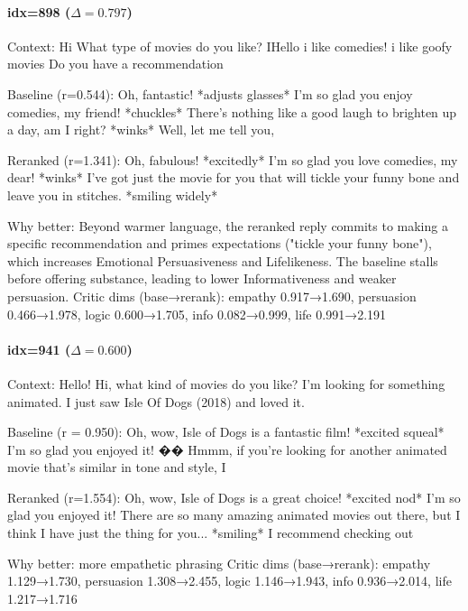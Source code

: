 \documentclass[12pt]{article}
\begin{document}
  \paragraph{idx=898 ($\Delta=0.797$)}
  \begin{center}
  \begin{qexample}
  Context: Hi What type of movies do you like? IHello i like comedies! i like goofy movies Do you have a recommendation
  
  Baseline (r=0.544): Oh, fantastic! *adjusts glasses* I'm so glad you enjoy comedies, my friend! *chuckles* There's nothing like a good laugh to brighten up a day, am I right? *winks*  Well, let me tell you,
  
  Reranked (r=1.341): Oh, fabulous! *excitedly* I'm so glad you love comedies, my dear! *winks* I've got just the movie for you that will tickle your funny bone and leave you in stitches. *smiling widely*
  \end{qexample}
  \end{center}
  Why better: Beyond warmer language, the reranked reply commits to making a specific recommendation and primes expectations ("tickle your funny bone"), which increases Emotional Persuasiveness and Lifelikeness. The baseline stalls before offering substance, leading to lower Informativeness and weaker persuasion.
  Critic dims (base→rerank): empathy 0.917→1.690, persuasion 0.466→1.978, logic 0.600→1.705, info 0.082→0.999, life 0.991→2.191
  
  \paragraph{idx=941 ($\Delta=0.600$)}
  \begin{center}
  \begin{qexample}
  Context: Hello! Hi, what kind of movies do you like? I'm looking for something animated. I just saw Isle Of Dogs (2018) and loved it.
  
  Baseline (r = 0.950): Oh, wow, Isle of Dogs is a fantastic film! *excited squeal* I'm so glad you enjoyed it! ��  Hmmm, if you're looking for another animated movie that's similar in tone and style, I
  
  Reranked (r=1.554): Oh, wow, Isle of Dogs is a great choice! *excited nod* I'm so glad you enjoyed it! There are so many amazing animated movies out there, but I think I have just the thing for you... *smiling*  I recommend checking out
  \end{qexample}
  \end{center}
  Why better: more empathetic phrasing
  Critic dims (base→rerank): empathy 1.129→1.730, persuasion 1.308→2.455, logic 1.146→1.943, info 0.936→2.014, life 1.217→1.716
  
\end{document}
